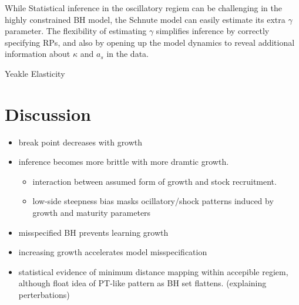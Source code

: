 %
While Statistical inference in the oscillatory regiem can be challenging in
the highly constrained BH model, the Schnute model can easily estimate its extra
$\gamma$ parameter. The flexibility of estimating $\gamma$ simplifies inference by 
correctly specifying RPs, and also by opening up the model dynamics to reveal
additional information about $\kappa$ and $a_s$ in the data. %

{\color{red} Yeakle Elasticity \cite{yeakel_generalized_2015}}


%
\clearpage
\section{Discussion}

\begin{itemize}
        \item break point decreases with growth
        \item inference becomes more brittle with more dramtic growth.
        \begin{itemize}
                \item interaction between assumed form of growth and stock recruitment.
                \item low-side steepness bias masks ocillatory/shock patterns induced by growth and maturity parameters
        \end{itemize}
        \item misspecified BH prevents learning growth
        \item increasing growth accelerates model misspecification
        \item statistical evidence of minimum distance mapping within accepible regiem, although float idea of PT-like pattern as BH set flattens. (explaining perterbations)
\end{itemize}

